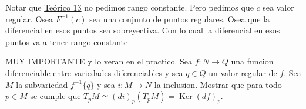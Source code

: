 \label{blk:3f8e58}
\begin{bookremark}{}
Notar que \hyperref[blk:3f8e58]{Teórico 13} no pedimos rango constante. Pero pedimos que $c$ sea valor regular. Osea $F^{-1}(c)$ sea una conjunto de puntos regulares. Osea que la diferencial en esos puntos sea sobreyectiva. Con lo cual la diferencial en esos puntos va a tener rango constante

\end{bookremark}
\begin{bookexercise}{MUY IMPORTANTE y lo veran en el practico.}
Sea $f:N\to Q$ una funcion diferenciable entre variedades diferenciables y sea $q\in Q$ un valor regular de $f$. Sea $M$ la subvariedad $f^{-1}\{q\}$ y sea $i:M\to N$ la inclusion. Mostrar que para todo $p\in M$ se cumple que $T_pM\simeq (di)_p(T_pM)=\operatorname{Ker}(df)_p$.

\end{bookexercise}

